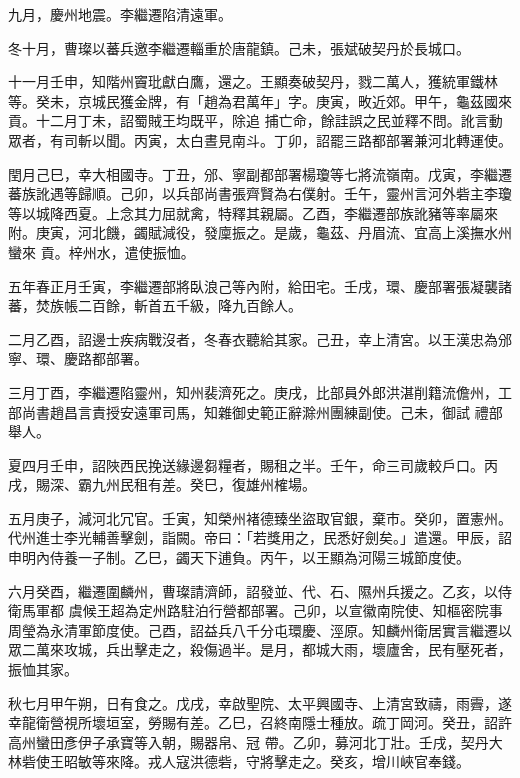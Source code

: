 \begin{pinyinscope}
 九月，慶州地震。李繼遷陷清遠軍。



 冬十月，曹璨以蕃兵邀李繼遷輜重於唐龍鎮。己未，張斌破契丹於長城口。



 十一月壬申，知階州竇玭獻白鷹，還之。王顯奏破契丹，戮二萬人，獲統軍鐵林等。癸未，京城民獲金牌，有「趙為君萬年」字。庚寅，畋近郊。甲午，龜茲國來貢。十二月丁未，詔蜀賊王均既平，除追
 捕亡命，餘詿誤之民並釋不問。訛言動眾者，有司斬以聞。丙寅，太白晝見南斗。丁卯，詔罷三路都部署兼河北轉運使。



 閏月己巳，幸大相國寺。丁丑，邠、寧副都部署楊瓊等七將流嶺南。戊寅，李繼遷蕃族訛遇等歸順。己卯，以兵部尚書張齊賢為右僕射。壬午，靈州言河外砦主李瓊等以城降西夏。上念其力屈就禽，特釋其親屬。乙酉，李繼遷部族訛豬等率屬來附。庚寅，河北饑，蠲賦減役，發廩振之。是歲，龜茲、丹眉流、宜高上溪撫水州蠻來
 貢。梓州水，遣使振恤。



 五年春正月壬寅，李繼遷部將臥浪己等內附，給田宅。壬戌，環、慶部署張凝襲諸蕃，焚族帳二百餘，斬首五千級，降九百餘人。



 二月乙酉，詔邊士疾病戰沒者，冬春衣聽給其家。己丑，幸上清宮。以王漢忠為邠寧、環、慶路都部署。



 三月丁酉，李繼遷陷靈州，知州裴濟死之。庚戌，比部員外郎洪湛削籍流儋州，工部尚書趙昌言責授安遠軍司馬，知雜御史範正辭滁州團練副使。己未，御試
 禮部舉人。



 夏四月壬申，詔陜西民挽送緣邊芻糧者，賜租之半。壬午，命三司歲較戶口。丙戌，賜深、霸九州民租有差。癸巳，復雄州榷場。



 五月庚子，減河北冗官。壬寅，知榮州褚德臻坐盜取官銀，棄市。癸卯，置憲州。代州進士李光輔善擊劍，詣闕。帝曰：「若獎用之，民悉好劍矣。」遣還。甲辰，詔申明內侍養一子制。乙巳，蠲天下逋負。丙午，以王顯為河陽三城節度使。



 六月癸酉，繼遷圍麟州，曹璨請濟師，詔發並、代、石、隰州兵援之。乙亥，以侍衛馬軍都
 虞候王超為定州路駐泊行營都部署。己卯，以宣徽南院使、知樞密院事周瑩為永清軍節度使。己酉，詔益兵八千分屯環慶、涇原。知麟州衛居實言繼遷以眾二萬來攻城，兵出擊走之，殺傷過半。是月，都城大雨，壞廬舍，民有壓死者，振恤其家。



 秋七月甲午朔，日有食之。戊戌，幸啟聖院、太平興國寺、上清宮致禱，雨霽，遂幸龍衛營視所壞垣室，勞賜有差。乙巳，召終南隱士種放。疏丁岡河。癸丑，詔許高州蠻田彥伊子承寶等入朝，賜器帛、冠
 帶。乙卯，募河北丁壯。壬戌，契丹大林砦使王昭敏等來降。戎人寇洪德砦，守將擊走之。癸亥，增川峽官奉錢。




\end{pinyinscope}
